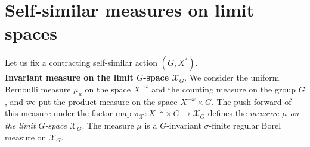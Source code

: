 \documentclass[12pt]{article}
\newcommand{\xmo}{X^{-\omega}}
\newcommand{\limGs}[1][G]{\mathcal{X}_{#1}}
\theoremstyle{definition}
\begin{document}

\section{Self-similar measures on limit spaces}\label{section_Measures}

Let us fix a contracting self-similar action $(G,X^*)$.\\

\noindent\textbf{Invariant measure on the limit $G$-space $\limGs$}. We consider the uniform
Bernoulli measure $\mu_u$ on the space $\xmo$ and the counting measure on the group $G$, and we put
the product measure on the space $\xmo\times G$. The push-forward of this measure under the factor
map $\pi_{\limGs[]}:\xmo\times G\rightarrow\limGs$ defines the \textit{measure $\mu$ on the limit
$G$-space} $\limGs$. The measure $\mu$ is a $G$-invariant $\sigma$-finite regular Borel measure on
$\limGs$.
\end{document}
